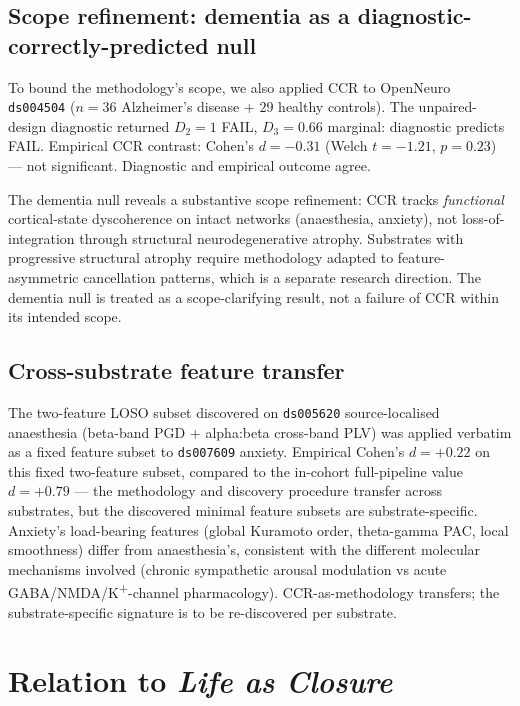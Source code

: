 \documentclass[11pt,a4paper]{article}
\begin{document}
\subsection{Scope refinement: dementia as a diagnostic-correctly-predicted null}\label{sec:results-dementia}

To bound the methodology's scope, we also applied CCR to OpenNeuro \texttt{ds004504} \citep{MiltiadousDementia2023} ($n = 36$ Alzheimer's disease + $29$ healthy controls). The unpaired-design diagnostic returned $D_2 = 1$ FAIL, $D_3 = 0.66$ marginal: diagnostic predicts FAIL. Empirical CCR contrast: Cohen's $d = -0.31$ (Welch $t = -1.21$, $p = 0.23$) --- not significant. Diagnostic and empirical outcome agree.

The dementia null reveals a substantive scope refinement: CCR tracks \emph{functional} cortical-state dyscoherence on intact networks (anaesthesia, anxiety), not loss-of-integration through structural neurodegenerative atrophy. Substrates with progressive structural atrophy require methodology adapted to feature-asymmetric cancellation patterns, which is a separate research direction. The dementia null is treated as a scope-clarifying result, not a failure of CCR within its intended scope.

\subsection{Cross-substrate feature transfer}\label{sec:results-transfer}

The two-feature LOSO subset discovered on \texttt{ds005620} source-localised anaesthesia (beta-band PGD + alpha:beta cross-band PLV) was applied verbatim as a fixed feature subset to \texttt{ds007609} anxiety. Empirical Cohen's $d = +0.22$ on this fixed two-feature subset, compared to the in-cohort full-pipeline value $d = +0.79$ --- the methodology and discovery procedure transfer across substrates, but the discovered minimal feature subsets are substrate-specific. Anxiety's load-bearing features (global Kuramoto order, theta-gamma PAC, local smoothness) differ from anaesthesia's, consistent with the different molecular mechanisms involved (chronic sympathetic arousal modulation vs acute GABA/NMDA/K\textsuperscript{+}-channel pharmacology). CCR-as-methodology transfers; the substrate-specific signature is to be re-discovered per substrate.

\section{Relation to \emph{Life as Closure}}\label{sec:relation-life}
\end{document}
